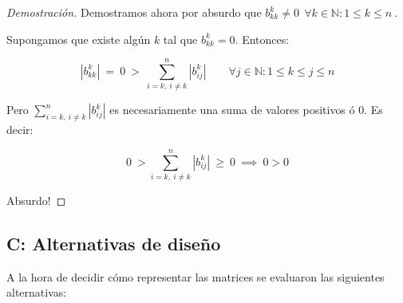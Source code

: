 \begin{proof}[Demostración]
\vspace{2em}
\noindent Demostramos ahora por absurdo que $b^{k}_{kk} \neq 0\ \ \forall k \in \mathbb{N}: 1 \leq k \leq n\ $.

\vspace{1em}
\noindent Supongamos que existe algún $k$ tal que $b^{k}_{kk} = 0$. Entonces:

\begin{equation*}
    |b^{k}_{kk}| \ =\ 0\ >\ \sum_{i = k,\ i \neq k}^{n} |b^{k}_{ij}| \qquad \forall j \in \mathbb{N}: 1 \leq k \leq j \leq n
\end{equation*}

\vspace{1em}
\noindent Pero $\sum_{i = k,\ i \neq k}^{n} |b^{k}_{ij}|$ es necesariamente una suma de valores positivos ó $0$. Es decir: 

\begin{equation*}
    0\ > \sum_{i = k,\ i \neq k}^{n} |b^{k}_{ij}|\ \geq\ 0\ \implies\ 0 > 0
\end{equation*}

\vspace{1em}
\noindent Absurdo! 

\end{proof}
 



\newpage
\subsection{C: Alternativas de diseño}\label{A.3}

A la hora de decidir cómo representar las matrices se evaluaron las siguientes alternativas:

